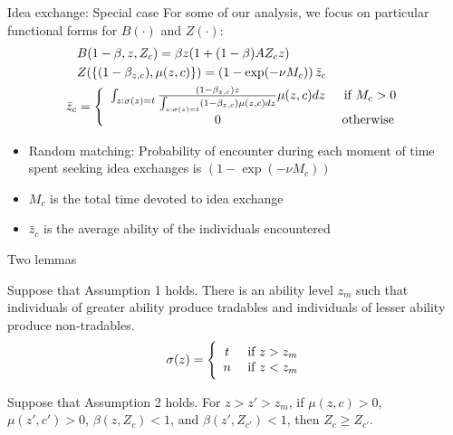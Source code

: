 \documentclass[11pt,notes=hide,aspectratio=169]{beamer}
\begin{document}
\begin{frame}{Idea exchange: Special case}
For some of our analysis, we focus on particular functional forms for $B(\cdot)$ and $Z(\cdot)$:
\begin{align*}
&B(1-\beta,z,Z_c) = {\beta}z(1+(1-\beta)A{Z}_{c}z) \\
&Z(\{(1-\beta_{z,c}),\mu(z,c)\})  = \left(1-\exp(-\nu M_c) \right) \bar{z}_{c} \\
\bar{z}_{c} & =\Bigg\{\begin{array}{cc}
\int_{z: \sigma(z)=t}\frac{(1-\beta_{z,c})z}{\int_{z: \sigma(z)=t}(1-\beta_{z,c})\mu(z,c) dz}\mu(z,c) dz & \textnormal{ if }M_{c}>0\\
0 & \textnormal{ otherwise } \nonumber
\end{array} 
\end{align*}
\begin{itemize}
	\item Random matching: Probability of encounter during each moment of time spent seeking idea exchanges is $\left(1-\exp(-\nu M_c) \right)$
	\item $M_{c}$ is the total time devoted to idea exchange
	\item $\bar{z}_{c}$ is the average ability of the individuals encountered
\end{itemize}
\end{frame}
\begin{frame}{Two lemmas}
\begin{lemma}
\label{lemma:ComparativeAdvantage}
Suppose that Assumption 1 holds. There is an ability level $z_m$ such that individuals of greater ability produce tradables and individuals of lesser ability produce non-tradables. 
\begin{align*}
\sigma(z) =  \Bigg\{\begin{array}{cc}
t & \textnormal{ if } z > z_m \\
n & \textnormal{ if } z < z_m \end{array}
\end{align*}
\end{lemma} 
\begin{lemma}\label{lemma:spatialsorting}
Suppose that Assumption 2 holds. For $z>z'>z_m$, if $\mu(z,c)>0$, $\mu(z',c')>0$, $\beta(z,Z_{c})<1$, and $\beta(z',Z_{c'})<1$, then $Z_c \geq Z_{c'}$.
\end{lemma}
\end{frame}
\end{document}
